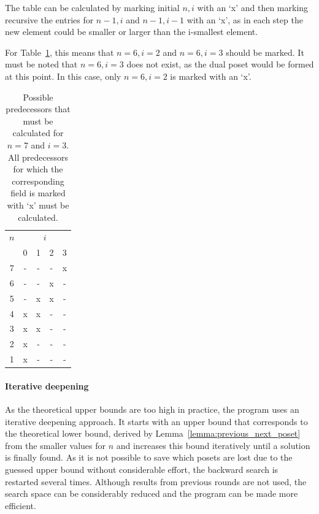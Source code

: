 \documentclass[twoside,leqno,twocolumn]{article}
\begin{document}
The table can be calculated by marking initial $n, i$ with an `x' and then marking recursive the entries for $n - 1, i$ and $n - 1, i - 1$ with an `x', as in each step the new element could be smaller or larger than the i-smallest element.

For Table~\ref{table:n_i_values_calculated}, this means that $n = 6, i = 2$ and $n = 6, i = 3$ should be marked.
It must be noted that $n = 6, i = 3$ does not exist, as the dual poset would be formed at this point.
In this case, only $n = 6, i = 2$ is marked with an `x'.

\begin{table}[!t]
  \renewcommand{\arraystretch}{1.2}
  \caption{Possible predecessors that must be calculated for $n = 7$ and $i = 3$. All predecessors for which the corresponding field is marked with `x' must be calculated.}
  \label{table:n_i_values_calculated}
  \centering
  \begin{tabular}{c|cccc}
    $n$ & \multicolumn{4}{c}{$i$}             \\
        & 0                       & 1 & 2 & 3 \\ \hline
    7   & -                       & - & - & x \\
    6   & -                       & - & x & - \\
    5   & -                       & x & x & - \\
    4   & x                       & x & - & - \\
    3   & x                       & x & - & - \\
    2   & x                       & - & - & - \\
    1   & x                       & - & - & - \\
  \end{tabular}%
\end{table}

\paragraph{Iterative deepening}
As the theoretical upper bounds are too high in practice, the program uses an iterative deepening approach.
It starts with an upper bound that corresponds to the theoretical lower bound, derived by Lemma~\ref{lemma:previous_next_poset} from the smaller values for $n$ and increases this bound iteratively until a solution is finally found.
As it is not possible to save which posets are lost due to the guessed upper bound without considerable effort, the backward search is restarted several times.
Although results from previous rounds are not used, the search space can be considerably reduced and the program can be made more efficient.
\end{document}
